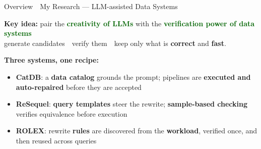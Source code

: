 \documentclass[aspectratio=169]{beamer}
\newcommand{\hred}[1]{\textcolor{tug}{\textbf{#1}}}
\newcommand{\hgreen}[1]{\textcolor{darkgreen}{\textbf{#1}}}
\newcommand{\hblue}[1]{\textcolor{tugb}{\textbf{#1}}}
\newcommand{\apptitle}[3]{%
  \textcolor{#1}{#2}~\textcolor{black!30}{\textbar}~#3}
\begin{document}
\begin{frame}{\apptitle{black!60}{Overview}{My Research --- LLM-assisted Data Systems}}
\footnotesize

\vspace{1mm}
\begin{exampleblock}{}
  \vspace{1mm}
  \centering
  \textbf{Key idea:} pair the \hgreen{creativity of LLMs} with the
  \hgreen{verification power of data systems} \\[2pt]
  generate candidates\ \faArrowRight\ verify them\ \faArrowRight\ keep only what is \textbf{correct} and \textbf{fast}.
  \vspace{1mm}
\end{exampleblock}
\vspace{4mm}

\textbf{Three systems, one recipe:}\\[4pt]

\begin{itemize}\setlength\itemsep{6pt}
  \item \hblue{CatDB}: a \textbf{data catalog} grounds the prompt; pipelines are \textbf{executed and auto-repaired} before they are accepted
  \item \hred{ReSequel}: \textbf{query templates} steer the rewrite; \textbf{sample-based checking} verifies equivalence before execution
  \item \hred{ROLEX}: rewrite \textbf{rules} are discovered from the \textbf{workload}, verified once, and then reused across queries
\end{itemize}
\end{frame}
\end{document}
